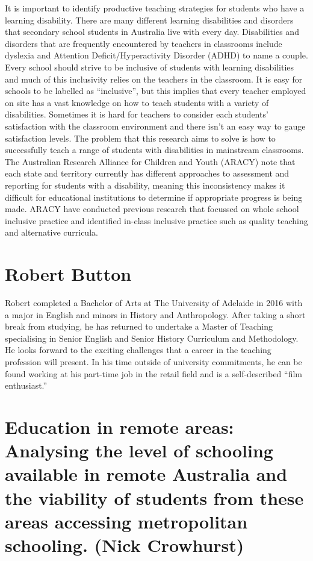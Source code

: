 \documentclass[twoside,14pt,a4paper,notitlepage]{memoir}
\begin{document}
It is important to identify productive teaching strategies for students who have a learning disability. There are many different learning disabilities and disorders that secondary school students in Australia live with every day. Disabilities and disorders that are frequently encountered by teachers in classrooms include dyslexia and Attention Deficit/Hyperactivity Disorder (ADHD) to name a couple. Every school should strive to be inclusive of students with learning disabilities and much of this inclusivity relies on the teachers in the classroom. It is easy for schools to be labelled as “inclusive”, but this implies that every teacher employed on site has a vast knowledge on how to teach students with a variety of disabilities. Sometimes it is hard for teachers to consider each students’ satisfaction with the classroom environment and there isn’t an easy way to gauge satisfaction levels. The problem that this research aims to solve is how to successfully teach a range of students with disabilities in mainstream classrooms. The Australian Research Alliance for Children and Youth (ARACY) note that each state and territory currently has different approaches to assessment and reporting for students with a disability, meaning this inconsistency makes it difficult for educational institutions to determine if appropriate progress is being made. ARACY have conducted previous research that focussed on whole school inclusive practice and identified in-class inclusive practice such as quality teaching and alternative curricula.

\section*{Robert Button}

Robert completed a Bachelor of Arts at The University of Adelaide in 2016 with a major in English and minors in History and Anthropology. After taking a short break from studying, he has returned to undertake a Master of Teaching specialising in Senior English and Senior History Curriculum and Methodology. He looks forward to the exciting challenges that a career in the teaching profession will present.
In his time outside of university commitments, he can be found working at his part-time job in the retail field and is a self-described “film enthusiast.”



\section*{Education in remote areas: Analysing the level of schooling available in remote Australia and the viability of students from these areas accessing metropolitan schooling. (Nick Crowhurst)}
\label{aut:crowhurst}
\end{document}
